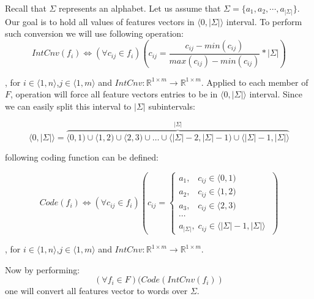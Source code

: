 \documentclass{article}
\begin{document}
Recall that $\Sigma$ represents an alphabet. Let us assume that $\Sigma = \{a_1 , a_2, \cdots, a_{|\Sigma|}\}$. Our goal is to hold all values of features vectors in $\langle 0 , |\Sigma| \rangle$ interval. To perform such conversion we will use following operation:
\begin{equation}
IntCnv(f_i) \Leftrightarrow (\forall{c_{ij} \in f_i})(c_{ij} =  \frac{c_{ij} - min(c_{ij})}{max(c_{ij}) - min(c_{ij})} * |\Sigma|)
\end{equation}

, for $i \in \langle 1, n \rangle$,$j \in \langle 1, m \rangle$ and $IntCnv : \mathbb{R}^{1 \times m} \rightarrow \mathbb{R}^{1 \times m}$. Applied to each member of $F$, operation will force all feature vectors entries to be in $\langle 0 , |\Sigma| \rangle$ interval. Since we can easily split this interval to $|\Sigma|$ subintervals:

\[
\langle 0 , |\Sigma| \rangle = \overbrace{\langle 0 , 1) \cup \langle 1 , 2 ) \cup \langle 2 , 3 ) \cup \ldots \cup \langle |\Sigma| -2 , |\Sigma| -1 ) \cup \langle |\Sigma| -1, |\Sigma|  \rangle}^{|\Sigma|}
\]

following coding function can be defined:

\begin{equation}
Code(f_i) \Leftrightarrow (\forall{c_{ij} \in f_i})(c_{ij} =
\begin{cases}
a_1 , \;\;\; c_{ij} \in  \langle 0 , 1)  \\
a_2 , \;\;\; c_{ij} \in  \langle 1 , 2 ) \\
a_3 , \;\;\; c_{ij} \in  \langle 2 , 3 )\\
\cdots \\
a_{|\Sigma|} , \; c_{ij} \in \langle |\Sigma| -1, |\Sigma|  \rangle\;
\end{cases})
\end{equation}

, for $i \in \langle 1, n \rangle$,$j \in \langle 1, m \rangle$ and $IntCnv : \mathbb{R}^{1 \times m} \rightarrow \mathbb{R}^{1 \times m}$.

Now by performing:
\begin{equation}
(\forall{f_i \in F})(Code(IntCnv(f_i))
\end{equation}
one will convert all features vector to words over $\Sigma$.

\end{document}
